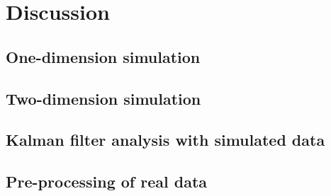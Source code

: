 \documentclass[12pt, a4paper]{article} %
\begin{document}
\newpage


\section{Discussion}

\subsection{One-dimension simulation}

\setlength{\parskip}{0mm}

\setlength{\parskip}{4mm}


\subsection{Two-dimension simulation}

\setlength{\parskip}{0mm}

\setlength{\parskip}{4mm}

\subsection{Kalman filter analysis with simulated data}

\setlength{\parskip}{0mm}

\setlength{\parskip}{4mm}

\subsection{Pre-processing of real data}

\setlength{\parskip}{0mm}
\end{document}
